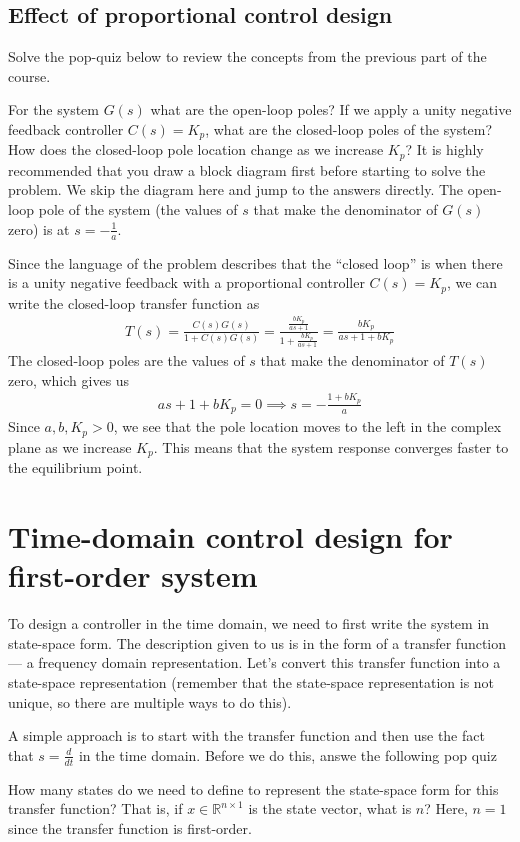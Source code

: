 \documentclass{ee122_notes}
\begin{document}
\subsection{Effect of proportional control design}
Solve the pop-quiz below to review the concepts from the previous part of the course.
\begin{popquiz}
For the system $G(s)$ what are the open-loop poles? If we apply a unity negative feedback controller $C(s) = K_p$, what are the closed-loop poles of the system? How does the closed-loop pole location change as we increase $K_p$? 
\popqsplit 
It is highly recommended that you draw a block diagram first before starting to solve the problem. We skip the diagram here and jump to the answers directly. The open-loop pole of the system (the values of $s$ that make the denominator of $G(s)$ zero) is at $s = -\frac{1}{a}$. 

Since the language of the problem describes that the ``closed loop'' is when there is a unity negative feedback with a proportional controller $C(s) = K_p$, we can write the closed-loop transfer function as
\begin{align*}
    T(s) = \frac{C(s)G(s)}{1 + C(s)G(s)} = \frac{\frac{bK_p}{as + 1}}{1 + \frac{bK_p}{as + 1}} = \frac{bK_p}{as + 1 + bK_p}
\end{align*}
The closed-loop poles are the values of $s$ that make the denominator of $T(s)$ zero, which gives us
\begin{align*}
    as + 1 + bK_p = 0 \implies s = -\frac{1 + bK_p}{a}
\end{align*}
Since $a, b, K_p > 0$, we see that the pole location moves to the left in the complex plane as we increase $K_p$. This means that the system response converges faster to the equilibrium point.
\end{popquiz} 
\section{Time-domain control design for first-order system}
To design a controller in the time domain, we need to first write the system in state-space form. The description given to us is in the form of a transfer function --- a frequency domain representation. Let's convert this transfer function into a state-space representation (remember that the state-space representation is not unique, so there are multiple ways to do this). 

A simple approach is to start with the transfer function and then use the fact that $s = \frac{d}{dt}$ in the time domain. Before we do this, answe the following pop quiz
\begin{popquiz}
    How many states do we need to define to represent the state-space form for this transfer function? That is, if $x \in \mathbb{R}^{n \times 1}$ is the state vector, what is $n$?
\popqsplit
Here, $n=1$ since the transfer function is first-order.
\end{popquiz}
\end{document}
